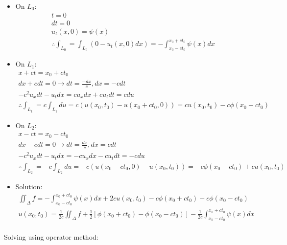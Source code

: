 \documentclass[12pt, a4paper]{article}
\begin{document}
\begin{itemize}
    \item On $L_0$:
    \begin{gather*}
        t = 0 \\
        dt = 0 \\
        u_t(x, 0) = \psi(x) \\
        \therefore \int_{L_0} = \int_{L_0} (0 - u_t(x, 0) dx) = -\int_{x_0-ct_0}^{x_0+ct_0}\psi(x)dx
    \end{gather*}
    \item On $L_1$:
    \begin{gather*}
        x + ct = x_0 + ct_0  \\
        dx + cdt = 0 \rightarrow dt = \frac{-dx}{c}, dx = -cdt\\
        -c^2u_xdt - u_tdx =  cu_xdx + cu_tdt = cdu\\
        \therefore \int_{L_1} = c\int_{L_1} du = c(u(x_0, t_0) - u(x_0+ct_0, 0)) = cu(x_0, t_0) - c\phi(x_0 +ct_0)
    \end{gather*}
    \item On $L_2$:
    \begin{gather*}
        x - ct = x_0 - ct_0  \\
        dx - cdt = 0 \rightarrow dt = \frac{dx}{c}, dx = cdt\\
        -c^2u_xdt - u_tdx =  -cu_xdx - cu_tdt = -cdu\\
        \therefore \int_{L_2} = -c\int_{L_2} du = -c(u(x_0-ct_0, 0) - u(x_0, t_0)) = -c\phi(x_0 -ct_0) +cu(x_0, t_0)
    \end{gather*}
    \item Solution:
    \begin{gather*}
        \iint_{\Delta}f = -\int_{x_0-ct_0}^{x_0+ct_0}\psi(x)dx + 2cu(x_0, t_0) - c\phi(x_0 +ct_0) -c\phi(x_0 -ct_0)\\
        u(x_0, t_0) = \frac{1}{2c}\iint_{\Delta}f  + \frac{1}{2}[\phi(x_0 +ct_0) -\phi(x_0 -ct_0)] -\frac{1}{2c}\int_{x_0-ct_0}^{x_0+ct_0}\psi(x)dx \\
    \end{gather*}
\end{itemize}
Solving using operator method:
\end{document}
